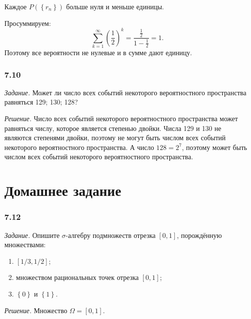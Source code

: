 Каждое $P \left( \left\{ r_n \right\} \right) $ больше нуля и меньше единицы.

Просуммируем:
$$\sum \limits_{k=1}^{ \infty } \left( \frac{1}{2} \right)^k =
\frac{ \frac{1}{2} }{1 - \frac{1}{2} } =
1.$$
Поэтому все вероятности не нулевые и в сумме дают единицу.

\subsubsection*{7.10}

\textit{Задание.} Может ли число всех событий некоторого вероятностного пространства равняться 129; 130; 128?

\textit{Решение.} Число всех событий некоторого вероятностного пространства может равняться числу, которое является степенью двойки.
Числа 129 и 130 не являются степенями двойки, поэтому не могут быть числом всех событий некоторого вероятностного пространства.
А число $128 = 2^7$, поэтому может быть числом всех событий некоторого вероятностного пространства.

\section*{Домашнее задание}

\subsubsection*{7.12}

\textit{Задание.} Опишите $ \sigma $-алгебру подмножеств отрезка $ \left[ 0, 1 \right] $, порождённую множествами:
\begin{enumerate}[label=\alph*)]
\item $ \left[ 1/3, 1/2 \right] $;
\item множеством рациональных точек отрезка $ \left[ 0, 1 \right] $;
\item $ \left\{ 0 \right\} $ и $ \left\{ 1 \right\} $.
\end{enumerate}

\textit{Решение.} Множество $ \Omega = \left[ 0, 1 \right] $.

